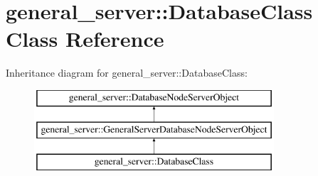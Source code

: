 \hypertarget{classgeneral__server_1_1DatabaseClass}{\section{general\-\_\-server\-:\-:\-Database\-Class \-Class \-Reference}
\label{classgeneral__server_1_1DatabaseClass}
}
\-Inheritance diagram for general\-\_\-server\-:\-:\-Database\-Class\-:\begin{figure}[H]
\begin{center}
\leavevmode
\includegraphics[height=3.000000cm]{classgeneral__server_1_1DatabaseClass}
\end{center}
\end{figure}
